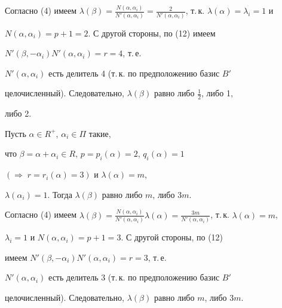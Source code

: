\begin{pf}


Согласно (4) имеем $\lambda(\beta)=


\frac{N(\alpha,\alpha_i)}{N'(\alpha,\alpha_i)}=


\frac2{N'(\alpha,\alpha_i)}$, т.\,к. $\lambda(\alpha)=\lambda_i=1$ и


$N(\alpha,\alpha_i)=p+1=2$.  С другой стороны, по (12) имеем


$N'(\beta,-\alpha_i)N'(\alpha,\alpha_i)=r=4$, т.\,е.


$N'(\alpha,\alpha_i)$ есть делитель 4 (т.\,к. по предположению базис $B'$


целочисленный). Следовательно, $\lambda(\beta)$ равно либо $\frac12$, либо 1,


либо 2.


\end{pf}





\begin{lem}


Пусть $\alpha\in R^+$, $\alpha_i\in\Pi$ такие,


что $\beta=\alpha+\alpha_i\in R$, $p=p_i(\alpha)=2$, $q_i(\alpha)=1$


$(\Rightarrow\;r=r_i(\alpha)=3)$ и $\lambda(\alpha)=m$,


$\lambda(\alpha_i)=1$. Тогда $\lambda(\beta)$ равно либо $m$, либо $3m$.


\end{lem}





\begin{pf}


Согласно (4) имеем $\lambda(\beta)=


\frac{N(\alpha,\alpha_i)}{N'(\alpha,\alpha_i)}\lambda(\alpha)=


\frac{3m}{N'(\alpha,\alpha_i)}$, т.\,к. $\lambda(\alpha)=m$,


$\lambda_i=1$ и $N(\alpha,\alpha_i)=p+1=3$.  С другой стороны, по (12)


имеем $N'(\beta,-\alpha_i)N'(\alpha,\alpha_i)=r=3$, т.\,е.


$N'(\alpha,\alpha_i)$ есть делитель 3 (т.\,к. по предположению базис $B'$


целочисленный). Следовательно, $\lambda(\beta)$ равно либо $m$, либо $3m$.


\end{pf}





